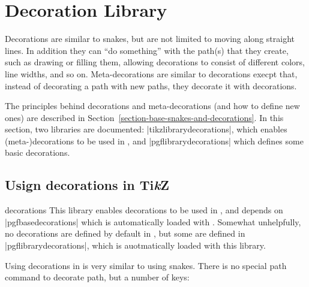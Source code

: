 %
%
%

\section{Decoration Library}
\label{section-library-decorations}

Decorations are similar to snakes, but are not limited to moving along
straight lines. In addition they can ``do something'' with the 
path(s) that they create, such as drawing or filling them, allowing
decorations to consist of different colors, line widths, and so on.
Meta-decorations are similar to decorations execpt that, instead of
decorating a path with new paths, they decorate it with decorations.

The principles behind decorations and meta-decorations (and how to
define new ones) are described in 
Section~\ref{section-base-snakes-and-decorations}. In this section, 
two libraries are documented: |tikzlibrarydecorations|, which enables 
(meta-)decorations to be used in \tikzname, and 
|pgflibrarydecorations| which defines some basic decorations.


\subsection{Usign decorations in Ti\emph{k}Z}

\begin{tikzlibrary}{decorations}
	This library enables decorations to be used in \tikzname, and depends
	on |pgfbasedecorations| which is automatically loaded with 
	\tikzname. 
	Somewhat unhelpfully, no decorations are defined by default in 
	\tikzname, but some are defined in |pgflibrarydecorations|, 
	which is auotmatically loaded with this library.
\end{tikzlibrary}


	Using decorations in \tikzname{} is very similar to using snakes.
	There is no special path command to decorate path, but a number of
	keys:

